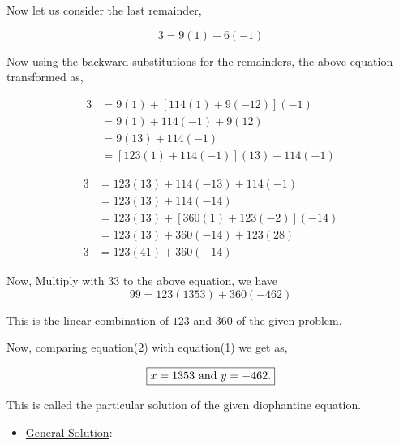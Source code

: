 \documentclass[a4paper,12pt]{article}
\begin{document}
    Now let us consider the last remainder,

    $$3 = 9(1) + 6(-1)$$

    Now using the backward substitutions for the remainders, the above equation transformed as,

    \begin{equation*}
        \begin{split}
            3 & = 9(1) + [114(1) + 9(-12)](-1) \\[2mm] 
            & = 9(1) + 114(-1) + 9(12) \\[2mm]
            & = 9(13) + 114(-1) \\[2mm]
            & = [123(1) + 114(-1)](13) + 114(-1) 
        \end{split}    
    \end{equation*}   
    
    \begin{equation*}
        \begin{split}
            3 & = 123(13) + 114(-13) + 114(-1) \\[2mm]
            & = 123(13) + 114(-14) \\[2mm]
            & = 123(13) + [360(1) + 123(-2)](-14) \\[2mm]
            & = 123(13) + 360(-14) + 123(28) \\[2mm]
            3 & = 123(41) + 360(-14)
        \end{split}
    \end{equation*}

    Now, Multiply with $33$ to the above equation, we have
    \begin{equation*}
        99 = 123(1353) + 360(-462) \tag{2}
    \end{equation*}
    

    This is the linear combination of $123$ and $360$ of the given problem.
    \vspace*{2mm}

    Now, comparing equation(2) with equation(1) we get as, 

    
    \begin{align*}
        \boxed{$$x = 1353\  \mbox{and}\  y = -462$$.}
    \end{align*}

    This is called the particular solution of the given diophantine equation.

    \begin{itemize}
        \item \underline{General Solution}:
    \end{itemize}
\end{document}

